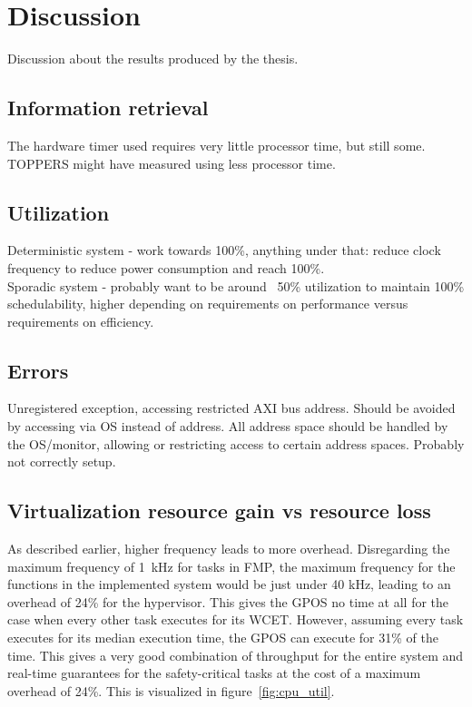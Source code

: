 \chapter{Discussion}
Discussion about the results produced by the thesis.

\section{Information retrieval}
The hardware timer used requires very little processor time, but still some. TOPPERS might have measured using less processor time.

\section{Utilization}
Deterministic system - work towards 100\%, anything under that: reduce clock frequency to reduce power consumption and reach 100\%.\\

Sporadic system - probably want to be around ~50\% utilization to maintain 100\% schedulability, higher depending on requirements on performance versus requirements on efficiency.

\section{Errors}
Unregistered exception, accessing restricted AXI bus address. Should be avoided by accessing via OS instead of address. All address space should be handled by the OS/monitor, allowing or restricting access to certain address spaces. Probably not correctly setup.

\section{Virtualization resource gain vs resource loss}
As described earlier, higher frequency leads to more overhead. Disregarding the maximum frequency of 1~kHz for tasks in FMP, the maximum frequency for the functions in the implemented system would be just under 40 kHz, leading to an overhead of 24\% for the hypervisor. This gives the GPOS no time at all for the case when every other task executes for its WCET. However, assuming every task executes for its median execution time, the GPOS can execute for 31\% of the time. This gives a very good combination of throughput for the entire system and real-time guarantees for the safety-critical tasks at the cost of a maximum overhead of 24\%. This is visualized in figure~\ref{fig:cpu_util}.

